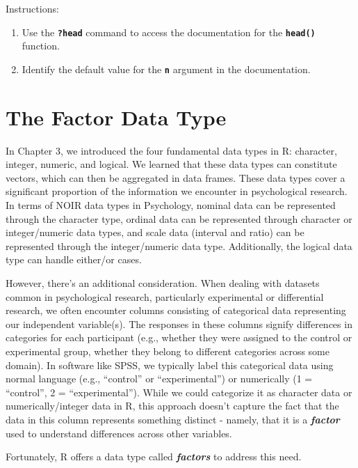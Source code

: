 \documentclass[
]{book}
\begin{document}
\begin{enumerate}
  Instructions:

  \begin{enumerate}
  \def\labelenumii{\arabic{enumii}.}
  \item
    Use the \textbf{\texttt{?head}} command to access the documentation for the \textbf{\texttt{head()}} function.
  \item
    Identify the default value for the \textbf{\texttt{n}} argument in the documentation.
  \end{enumerate}
\end{enumerate}

\hypertarget{the-factor-data-type}{%
\section{The Factor Data Type}\label{the-factor-data-type}}

In Chapter 3, we introduced the four fundamental data types in R: character, integer, numeric, and logical. We learned that these data types can constitute vectors, which can then be aggregated in data frames. These data types cover a significant proportion of the information we encounter in psychological research. In terms of NOIR data types in Psychology, nominal data can be represented through the character type, ordinal data can be represented through character or integer/numeric data types, and scale data (interval and ratio) can be represented through the integer/numeric data type. Additionally, the logical data type can handle either/or cases.

However, there's an additional consideration. When dealing with datasets common in psychological research, particularly experimental or differential research, we often encounter columns consisting of categorical data representing our independent variable(s). The responses in these columns signify differences in categories for each participant (e.g., whether they were assigned to the control or experimental group, whether they belong to different categories across some domain). In software like SPSS, we typically label this categorical data using normal language (e.g., ``control'' or ``experimental'') or numerically (1 = ``control'', 2 = ``experimental''). While we could categorize it as character data or numerically/integer data in R, this approach doesn't capture the fact that the data in this column represents something distinct - namely, that it is a \textbf{\emph{factor}} used to understand differences across other variables.

Fortunately, R offers a data type called \textbf{\emph{factors}} to address this need.
\end{document}
